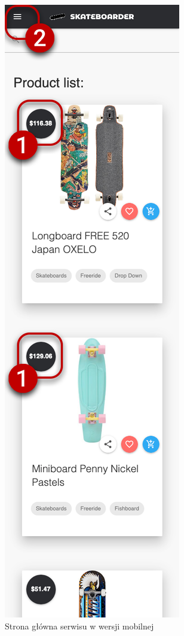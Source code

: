 \documentclass[12pt,a4paper,titlepage]{article}
\begin{document}
\begin{figure}[H]
    \centering
    \includegraphics[scale=.2]{Pics/mobileMainPage.png}
    \caption{Strona główna serwisu w wersji mobilnej}
    \label{pic:mobileMainPage}
\end{figure}
\end{document}
